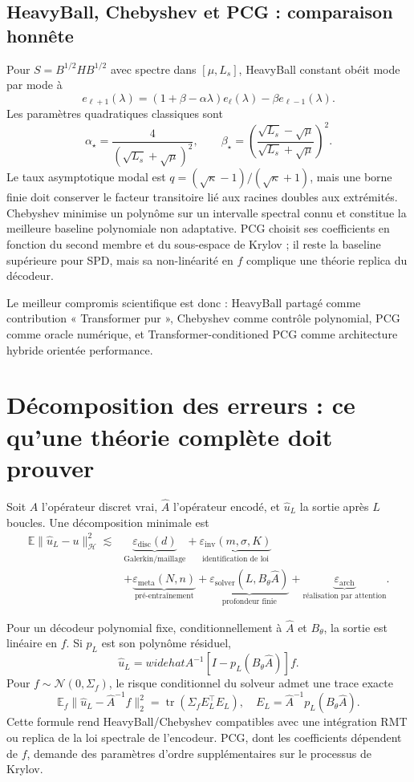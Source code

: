 \documentclass[11pt,a4paper]{article}
\newcommand{\E}{\mathbb{E}}
\newcommand{\cH}{\mathcal{H}}
\newcommand{\tr}{\operatorname{tr}}
\begin{document}
\subsection{HeavyBall, Chebyshev et PCG : comparaison honnête}

Pour $S=B^{1/2}HB^{1/2}$ avec spectre dans $[\mu,L_s]$, HeavyBall constant
obéit mode par mode à
\[
 e_{\ell+1}(\lambda)=
 (1+\beta-\alpha\lambda)e_\ell(\lambda)
 -\beta e_{\ell-1}(\lambda).
\]
Les paramètres quadratiques classiques sont
\[
 \alpha_\star=\frac{4}{(\sqrt{L_s}+\sqrt\mu)^2},\qquad
 \beta_\star=
 \left(\frac{\sqrt{L_s}-\sqrt\mu}
 {\sqrt{L_s}+\sqrt\mu}\right)^2.
\]
Le taux asymptotique modal est
$q=(\sqrt\kappa-1)/(\sqrt\kappa+1)$, mais une borne finie doit conserver le
facteur transitoire lié aux racines doubles aux extrémités. Chebyshev minimise
un polynôme sur un intervalle spectral connu et constitue la meilleure
baseline polynomiale non adaptative. PCG choisit ses coefficients en fonction
du second membre et du sous-espace de Krylov ; il reste la baseline supérieure
pour SPD, mais sa non-linéarité en $f$ complique une théorie replica du décodeur.

Le meilleur compromis scientifique est donc : HeavyBall partagé comme
contribution « Transformer pur », Chebyshev comme contrôle polynomial, PCG
comme oracle numérique, et Transformer-conditioned PCG comme architecture
hybride orientée performance.

\section{Décomposition des erreurs : ce qu'une théorie complète doit prouver}

Soit $A$ l'opérateur discret vrai, $\widehat A$ l'opérateur encodé, et
$\widehat u_L$ la sortie après $L$ boucles. Une décomposition minimale est
\begin{align}
\E\|\widehat u_L-u\|_{\cH}^2
\lesssim{}&
\underbrace{\varepsilon_{\mathrm{disc}}(d)}_{\text{Galerkin/maillage}}
+\underbrace{\varepsilon_{\mathrm{inv}}(m,\sigma,K)}_{\text{identification de loi}}
\nonumber\\
&+\underbrace{\varepsilon_{\mathrm{meta}}(N,n)}_{\text{pré-entraînement}}
+\underbrace{\varepsilon_{\mathrm{solver}}(L,B_\theta\widehat A)}_{\text{profondeur finie}}
+\underbrace{\varepsilon_{\mathrm{arch}}}_{\text{réalisation par attention}}.
\label{eq:riskdecomp}
\end{align}

Pour un décodeur polynomial fixe, conditionnellement à $\widehat A$ et
$B_\theta$, la sortie est linéaire en $f$. Si $p_L$ est son polynôme résiduel,
\[
 \widehat u_L=widehat A^{-1}
 [I-p_L(B_\theta\widehat A)]f.
\]
Pour $f\sim\mathcal N(0,\Sigma_f)$, le risque conditionnel du solveur admet une
trace exacte
\[
 \E_f\|\widehat u_L-\widehat A^{-1}f\|_2^2
 =\tr(\Sigma_f E_L^\top E_L),
 \quad E_L=\widehat A^{-1}p_L(B_\theta\widehat A).
\]
Cette formule rend HeavyBall/Chebyshev compatibles avec une intégration RMT ou
replica de la loi spectrale de l'encodeur. PCG, dont les coefficients dépendent
de $f$, demande des paramètres d'ordre supplémentaires sur le processus de
Krylov.
\end{document}
